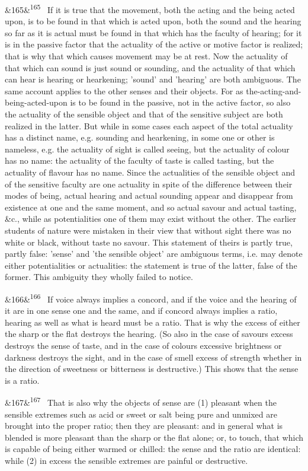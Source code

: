 \documentclass[12pt]{article}
\newcommand{\para}[1][]{\par\noindent\ifx&#1&\else\textsuperscript{\footnotesize #1}~\fi}
\begin{document}
\para[165] If it is true that the movement, both the acting and the being acted upon, is to be found in that which is acted upon, both the sound and the hearing so far as it is actual must be found in that which has the faculty of hearing; for it is in the passive factor that the actuality of the active or motive factor is realized; that is why that which causes movement may be at rest. Now the actuality of that which can sound is just sound or sounding, and the actuality of that which can hear is hearing or hearkening; 'sound' and 'hearing' are both ambiguous. The same account applies to the other senses and their objects. For as the-acting-and-being-acted-upon is to be found in the passive, not in the active factor, so also the actuality of the sensible object and that of the sensitive subject are both realized in the latter. But while in some cases each aspect of the total actuality has a distinct name, e.g. sounding and hearkening, in some one or other is nameless, e.g. the actuality of sight is called seeing, but the actuality of colour has no name: the actuality of the faculty of taste is called tasting, but the actuality of flavour has no name. Since the actualities of the sensible object and of the sensitive faculty are one actuality in spite of the difference between their modes of being, actual hearing and actual sounding appear and disappear from existence at one and the same moment, and so actual savour and actual tasting, \&c., while as potentialities one of them may exist without the other. The earlier students of nature were mistaken in their view that without sight there was no white or black, without taste no savour. This statement of theirs is partly true, partly false: 'sense' and 'the sensible object' are ambiguous terms, i.e. may denote either potentialities or actualities: the statement is true of the latter, false of the former. This ambiguity they wholly failed to notice.

\para[166] If voice always implies a concord, and if the voice and the hearing of it are in one sense one and the same, and if concord always implies a ratio, hearing as well as what is heard must be a ratio. That is why the excess of either the sharp or the flat destroys the hearing. (So also in the case of savours excess destroys the sense of taste, and in the case of colours excessive brightness or darkness destroys the sight, and in the case of smell excess of strength whether in the direction of sweetness or bitterness is destructive.) This shows that the sense is a ratio.

\para[167] That is also why the objects of sense are (1) pleasant when the sensible extremes such as acid or sweet or salt being pure and unmixed are brought into the proper ratio; then they are pleasant: and in general what is blended is more pleasant than the sharp or the flat alone; or, to touch, that which is capable of being either warmed or chilled: the sense and the ratio are identical: while (2) in excess the sensible extremes are painful or destructive.
\end{document}
